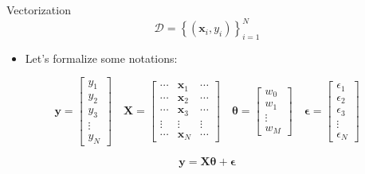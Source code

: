 \begin{frame}{Vectorization}
\[
\mathcal{D} = \left\{(\mathbf{x}_i, y_i)\right\}_{i=1}^{N}
\]

\begin{itemize}
    \item Let’s formalize some notations:
\end{itemize}

\[
\mathbf{y} =
\begin{bmatrix}
y_1 \\
y_2 \\
y_3 \\
\vdots \\
y_N
\end{bmatrix}
\quad
\mathbf{X} =
\begin{bmatrix}
\cdots & \mathbf{x}_1 & \cdots \\
\cdots & \mathbf{x}_2 & \cdots \\
\cdots & \mathbf{x}_3 & \cdots \\
\vdots & \vdots & \vdots \\
\cdots & \mathbf{x}_N & \cdots
\end{bmatrix}
\quad
\boldsymbol{\theta} =
\begin{bmatrix}
w_0 \\
w_1 \\
\vdots \\
w_M
\end{bmatrix}
\quad
\boldsymbol{\epsilon} =
\begin{bmatrix}
\epsilon_1 \\
\epsilon_2 \\
\epsilon_3 \\
\vdots \\
\epsilon_N
\end{bmatrix}
\]

\[
\mathbf{y} = \mathbf{X} \boldsymbol{\theta} + \boldsymbol{\epsilon}
\]

\end{frame}


